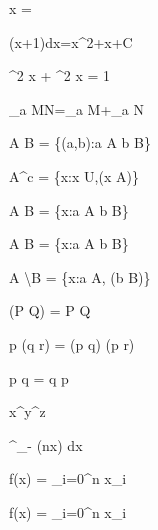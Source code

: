 x = 

\int (x+1)dx=x^2+x+C


\sin^2 x + \cos^2 x = 1

\log_a  MN=\log_a M+\log_a N

A \times B = \{(a,b):a \in A \wedge b \in B\}

A^c = \{x:x \in U,\neg (x \in A)\}

A \cup B = \{x:a \in A \vee b \in B\}

A \cap B = \{x:a \in A \wedge b \in B\}

A \backslash B = \{x:a \in A, \neg(b \in B)\}

\neg (P \vee Q) = \neg P \wedge \neg Q

p \vee (q \wedge r) = (p \vee q) \wedge (p \vee r)

p \vee q = q \vee p

x^{y^{z}}

\int^{}_{- } \sin(nx) dx

f(x) = \sum_{i=0}^n x_i

f(x) = \prod_{i=0}^n x_i